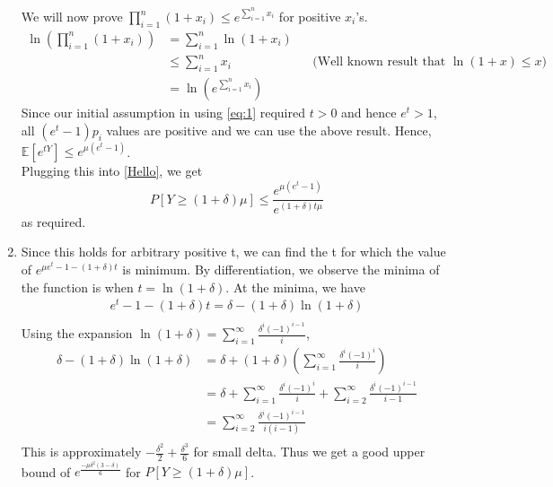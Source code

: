 \begin{enumerate}
    We will now prove $\prod_{i=1}^n (1+x_i) \le e^{\sum_{i=1}^n x_i}$ for positive $x_i$'s.
    \begin{align*}
        \ln\left(\prod_{i=1}^n (1+x_i)\right)&=\sum_{i=1}^n \ln(1+x_i)\\
        &\le \sum_{i=1}^n x_i && \text{(Well known result that $\ln(1+x)\le x$)}\\
        &= \ln\left(e^{\sum_{i=1}^n x_i}\right)
    \end{align*}
    Since our initial assumption in using \ref{eq:1} required $t>0$ and hence $e^t > 1$, all $(e^t-1)p_i$ values are positive and we can use the above result.
    Hence, $\mathbb{E}[e^{tY}] \le e^{\mu (e^t-1)}$.\\
    Plugging this into \ref{Hello}, we get
    \[
        P[Y\ge (1+\delta)\mu]\le \frac{e^{\mu(e^t-1)}}{e^{(1+\delta)t\mu}}
    \]
    as required.\\
    \item Since this holds for arbitrary positive t, we can find the t for which the value of $e^{\mu e^t-1-(1+\delta)t}$ is minimum. By differentiation, we observe the minima of the function is when $t=\ln(1+\delta)$. At the minima, we have
    \begin{align*}
        e^t-1-(1+\delta)t = \delta-(1+\delta)\ln(1+\delta)\\
    \end{align*}
    Using the expansion $\ln(1+\delta)=\sum_{i=1}^{\infty}\frac{\delta^i(-1)^{i-1}}{i}$,
    \begin{align*}
        \delta - (1+\delta)\ln(1+\delta) &= \delta + (1+\delta)(\sum_{i=1}^{\infty}\frac{\delta^i(-1)^i}{i})\\
        &= \delta + \sum_{i=1}^{\infty}\frac{\delta^i(-1)^i}{i} + \sum_{i=2}^{\infty}\frac{\delta^{i}(-1)^{i-1}}{i-1}\\
        &= \sum_{i=2}^{\infty} \frac{\delta^i(-1)^{i-1}}{i(i-1)}\\
    \end{align*}
    This is approximately $-\frac{\delta^2}{2} + \frac{\delta^3}{6}$ for small delta. Thus we get a good upper bound of $e^{\frac{-\mu\delta^2(3-\delta)}{6}}$ for $P[Y\ge (1+\delta)\mu]$.\\

\end{enumerate}
